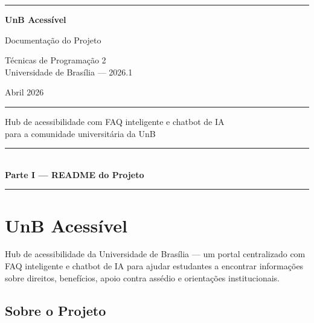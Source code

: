 \documentclass[12pt, a4paper]{article}
\newcommand{\partseparator}[1]{
  \clearpage
  \thispagestyle{empty}
  \vspace*{\fill}
  \begin{center}
    {\color{unbgreen}\rule{0.4\textwidth}{1pt}}\\[1.5em]
    {\Huge\bfseries\color{unbdark}#1}\\[1.5em]
    {\color{unbgreen}\rule{0.4\textwidth}{1pt}}
  \end{center}
  \vspace*{\fill}
  \clearpage
}
\begin{document}
\begin{titlepage}
  \thispagestyle{empty}
  \begin{center}
    \vspace*{2cm}

    {\color{unbgreen}\rule{\textwidth}{2pt}}

    \vspace{1.5cm}

    {\Huge\bfseries\color{unbdark}UnB Acessível}

    \vspace{0.8cm}

    {\LARGE\color{gray}Documentação do Projeto}

    \vspace{2cm}

    {\Large Técnicas de Programação 2}\\[0.5em]
    {\large Universidade de Brasília — 2026.1}

    \vspace{3cm}

    {\large Abril 2026}

    \vfill

    {\color{unbgreen}\rule{\textwidth}{2pt}}

    \vspace{1cm}

    {\small Hub de acessibilidade com FAQ inteligente e chatbot de IA\\para a comunidade universitária da UnB}
  \end{center}
\end{titlepage}

\tableofcontents
\clearpage


\partseparator{Parte I — README do Projeto}

\section{UnB Acessível}

Hub de acessibilidade da Universidade de Brasília — um portal centralizado com FAQ inteligente e chatbot de IA para ajudar estudantes a encontrar informações sobre direitos, benefícios, apoio contra assédio e orientações institucionais.

\subsection{Sobre o Projeto}
\end{document}
